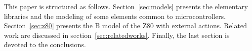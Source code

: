\documentclass[a4paper]{llncs}
\begin{document}
%

This paper is structured as follows.  Section~\ref{sec:models}
presents the elementary libraries and the modeling of some elements
common to microcontrollers.  Section~\ref{sec:z80} presents the B
model of the Z80 with external actions.  Related work are discussed in
section~\ref{sec:relatedworks}. Finally, the last section is devoted
to the conclusions.
\end{document}
